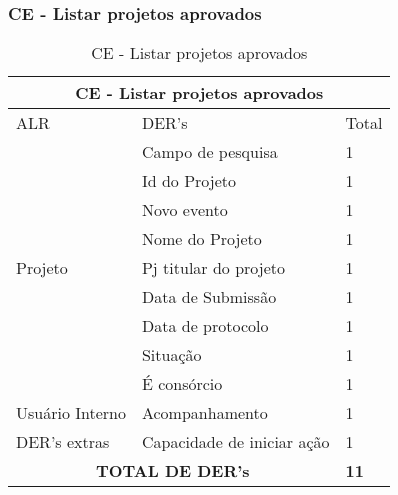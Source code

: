   \subsubsection{CE - Listar projetos aprovados}
\begin{table}[!h]
\centering
\caption{CE - Listar projetos aprovados}
\label{ce_listar_projetos_aprovados}
\begin{tabular}{|l|l|l|}
\multicolumn{3}{c}{CE - Listar projetos aprovados}                   \\\hline
ALR                      & DER's                      & Total         \\\hline
\multirow{9}{*}{Projeto} & Campo de pesquisa          & 1             \\ \cline{2-3}
                         & Id do Projeto                         & 1             \\ \cline{2-3}
                         & Novo evento                & 1             \\\cline{2-3}
                         & Nome do Projeto                    & 1             \\\cline{2-3}
                         & Pj titular do projeto      & 1             \\\cline{2-3}
                         & Data de Submissão          & 1             \\\cline{2-3}
                         & Data de protocolo          & 1             \\\cline{2-3}
                         & Situação                   & 1             \\\cline{2-3}
                         & É consórcio                & 1             \\\hline
Usuário Interno          & Acompanhamento             & 1             \\\hline
DER's extras             & Capacidade de iniciar ação & 1             \\\hline
\multicolumn{2}{|c|}{\textbf{TOTAL DE DER's}}                   & \textbf{11}  \\ \hline
\end{tabular}
\end{table}


